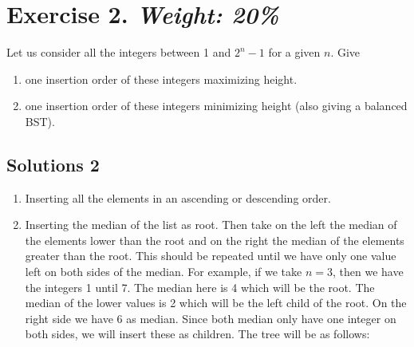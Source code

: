 \documentclass{article}
\begin{document}
\section*{Exercise 2. \textit{Weight: 20\%}}
Let us consider all the integers between 1 and $2^n - 1$ for a given $n$. Give
\begin{enumerate}
  \item one insertion order of these integers maximizing height.
  \item one insertion order of these integers minimizing height (also giving a balanced BST).
\end{enumerate}

\subsection*{Solutions 2}
\begin{enumerate}
  \item Inserting all the elements in an ascending or descending order.
  \item Inserting the median of the list as root. Then take on the left the median of the elements lower than the root and on the right the median of the elements greater than the root. This should be repeated until we have only one value left on both sides of the median.
  \newline
  For example, if we take $n = 3$, then we have the integers 1 until 7. The median here is 4 which will be the root. The median of the lower values is 2 which will be the left child of the root. On the right side we have 6 as median. Since both median only have one integer on both sides, we will insert these as children. The tree will be as follows:
  \begin{center}
\end{center}
\end{enumerate}
\end{document}
